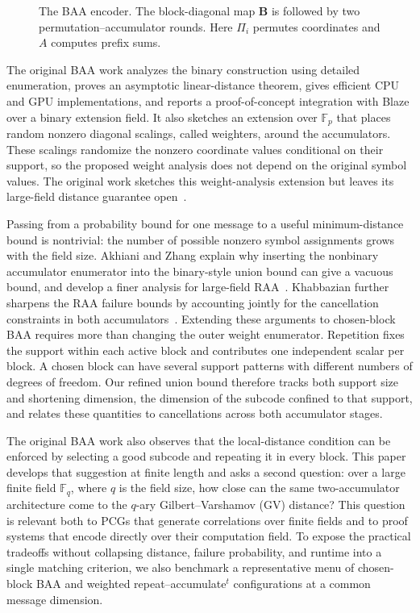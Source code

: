 \documentclass[runningheads,envcountsame,envcountsect]{llncs}
\newcommand{\F}{\mathbb F}
\begin{document}
\begin{figure}[b]
    \centering
    \resizebox{\linewidth}{!}{}
    \caption{The BAA encoder.  The block-diagonal map $\mathbf B$ is followed by two
    permutation--accumulator rounds.  Here $\Pi_i$ permutes coordinates and
    $A$ computes prefix sums.}
    \label{fig:baa-code-diagram}
\end{figure}

The original BAA work analyzes the binary construction using detailed
enumeration, proves an asymptotic linear-distance theorem, gives efficient CPU
and GPU implementations, and reports a proof-of-concept integration with Blaze
over a binary extension field.  It also sketches an extension over $\F_p$ that
places random nonzero diagonal scalings, called weighters, around the
accumulators.  These scalings randomize the nonzero coordinate values
conditional on their support, so the proposed weight analysis does not depend
on the original symbol values.  The original work sketches this weight-analysis
extension but leaves its large-field distance guarantee open~\cite{baa26}.

Passing from a probability bound for one message to a useful minimum-distance
bound is nontrivial: the number of possible nonzero symbol assignments grows
with the field size.  Akhiani and Zhang explain why inserting the nonbinary
accumulator enumerator into the binary-style union bound can give a vacuous
bound, and develop a finer analysis for large-field RAA~\cite{akhiani26}.
Khabbazian further sharpens the RAA failure bounds by accounting jointly for
the cancellation constraints in both accumulators~\cite{khabbazian26}.
Extending these arguments to chosen-block BAA requires more than changing
the outer weight enumerator.  Repetition fixes the support within each active
block and contributes one independent scalar per block.  A chosen block can
have several support patterns with different numbers of degrees of freedom.
Our refined union bound therefore tracks both support size and shortening
dimension, the dimension of the subcode confined to that support, and relates
these quantities to cancellations across both accumulator stages.

The original BAA work also observes that the local-distance condition can be
enforced by selecting a good subcode and repeating it in every block.  This
paper develops that suggestion at finite length and asks a second question:
over a large finite field $\F_q$, where $q$ is the field size, how close can the
 same two-accumulator architecture come to the $q$-ary Gilbert--Varshamov (GV)
 distance?  This question is relevant both to PCGs that generate correlations
 over finite fields and to proof systems that encode directly over their
  computation field.  To expose the practical tradeoffs without collapsing
  distance, failure probability, and runtime into a single matching criterion, we
  also benchmark a representative menu of chosen-block BAA and weighted
  repeat--accumulate$^t$ configurations at a common message dimension.
\end{document}
